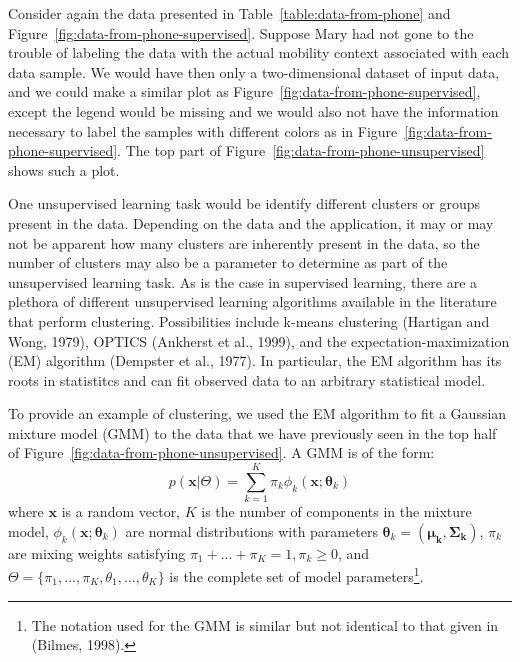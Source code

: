 Consider again the data presented in Table~\ref{table:data-from-phone} and Figure~\ref{fig:data-from-phone-supervised}. Suppose Mary had not gone to the trouble of labeling the data with the actual mobility context associated with each data sample. We would have then only a two-dimensional dataset of input data, and we could make a similar plot as Figure~\ref{fig:data-from-phone-supervised}, except the legend would be missing and we would also not have the information necessary to label the samples with different colors as in Figure~\ref{fig:data-from-phone-supervised}. The top part of Figure~\ref{fig:data-from-phone-unsupervised} shows such a plot.
%

One unsupervised learning task would be identify different clusters or groups present in the data. Depending on the data and the application, it may or may not be apparent how many clusters are inherently present in the data, so the number of clusters may also be a parameter to determine as part of the unsupervised learning task. As is the case in supervised learning, there are a plethora of different unsupervised learning algorithms available in the literature that perform clustering. Possibilities include k-means clustering (Hartigan and Wong, 1979), OPTICS (Ankherst et al., 1999), and the expectation-maximization (EM) algorithm (Dempster et al., 1977). In particular, the EM algorithm has its roots in statistitcs and can fit observed data to an arbitrary statistical model.

To provide an example of clustering, we used the EM algorithm to fit a Gaussian mixture model (GMM) to the data that we have previously seen in the top half of Figure~\ref{fig:data-from-phone-unsupervised}. A GMM is of the form:
%
\begin{equation}
 p(\mathbf{x}|\Theta) = \sum\limits_{k=1}^K \pi_k \phi_k(\mathbf{x}; \boldsymbol{\theta}_k)
\end{equation}
%
where $\mathbf{x}$ is a random vector, $K$ is the number of components in the mixture model, $\phi_k(\mathbf{x}; \boldsymbol{\theta}_k)$ are normal distributions with parameters $\boldsymbol{\theta}_k = (\boldsymbol{\mu_k}, \mathbf{\Sigma_k})$, $\pi_k$ are mixing weights satisfying $\pi_1 + ... + \pi_K = 1, \pi_k \geq 0$, and $\Theta = \{\pi_1,...,\pi_K,\theta_1, ..., \theta_K\}$ is the complete set of model parameters\footnote{The notation used for the GMM is similar but not identical to that given in (Bilmes, 1998).}.

